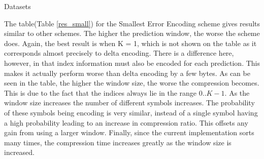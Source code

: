 \documentclass[a4paper,11pt]{report}
\begin{document}
\begin{section}{Datasets}
\begin{table}
\begin{center}
\end{center}
\caption{Compression information for the Smallest Error Encoding using different prediction window parameters. The first column represents the name of the dataset that the compression scheme was used on. The second column represents the size of the original file in MB. The third column shows the final size from quantisation only as a percentage of the original size. The remaining columns show two numbers: The first number is the compressed file sizes as a percentage of the original, the second number represents the time in seconds to compress the file.}
\label{res_small}
\end{table}

The table(Table \ref{res_small}) for the Smallest Error Encoding scheme gives results similar to other schemes. The higher the prediction window, the worse the scheme does. Again, the best result is when K = 1, which is not shown on the table as it corresponds almost precisely to delta encoding. There is a difference here, however, in that index information must also be encoded for each prediction. This makes it actually perform worse than delta encoding by a few bytes. As can be seen in the table, the higher the window size, the worse the compression becomes. This is due to the fact that the indices always lie in the range $0..K-1$. As the window size increases the number of different symbols increases. The probability of these symbols being encoding is very similar, instead of a single symbol having a high probability leading to an increase in compression ratio. This offsets any gain from using a larger window. Finally, since the current implementation sorts many times, the compression time increases greatly as the window size is increased.


\end{section}
\end{document}
